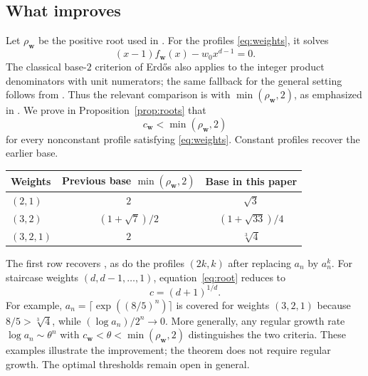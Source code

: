 \documentclass[11pt]{article}
\numberwithin{equation}{section}
\newcommand{\bw}{\mathbf w}
\begin{document}
\subsection{What improves}

Let $\rho_{\bw}$ be the positive root used in
\cite[Theorem~3]{BKKKZ}. For the profiles \eqref{eq:weights}, it solves
\begin{equation}\label{eq:oldroot}
  (x-1)f_{\bw}(x)-w_0x^{d-1}=0.
\end{equation}
The classical base-$2$ criterion of Erd\H{o}s \cite[Theorem~1]{Erdos1975}
also applies to the integer product denominators with unit numerators;
the same fallback for the general setting follows from
\cite[Theorem~3, $d=1$]{BKKKZ}. Thus the relevant comparison is with
$\min(\rho_{\bw},2)$, as emphasized in \cite[Remark~4(4)]{BKKKZ}.
We prove in Proposition~\ref{prop:roots} that
\begin{equation}\label{eq:improvement}
  c_{\bw}<\min(\rho_{\bw},2)
\end{equation}
for every nonconstant profile satisfying \eqref{eq:weights}.
Constant profiles recover the earlier base.

\begin{center}
\renewcommand{\arraystretch}{1.35}
\begin{tabular}{lcc}
\toprule
Weights & Previous base $\min(\rho_{\bw},2)$ & Base in this paper\\
\midrule
$(2,1)$ & $2$ & $\sqrt3$\\
$(3,2)$ & $(1+\sqrt7)/2$ & $(1+\sqrt{33})/4$\\
$(3,2,1)$ & $2$ & $\sqrt[3]{4}$\\
\bottomrule
\end{tabular}
\end{center}

The first row recovers \cite{Earlier}, as do the profiles $(2k,k)$
after replacing $a_n$ by $a_n^k$. For staircase weights
$(d,d-1,\ldots,1)$, equation~\eqref{eq:root} reduces to
\begin{equation}\label{eq:staircase}
  c=(d+1)^{1/d}.
\end{equation}
For example, $a_n=\lceil\exp((8/5)^n)\rceil$ is covered for weights
$(3,2,1)$ because $8/5>\sqrt[3]{4}$, while $(\log a_n)/2^n\to0$.
More generally, any regular growth rate $\log a_n\sim\theta^n$ with
$c_{\bw}<\theta<\min(\rho_{\bw},2)$ distinguishes the two criteria.
These examples illustrate the improvement; the theorem does not
require regular growth. The optimal thresholds remain open in general.
\end{document}
